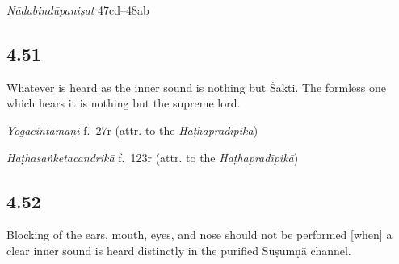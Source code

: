 \begin{ekdosis}
\begin{testimonia}[hp04_050]
\emph{Nādabindūpaniṣat} 47cd–48ab
\begin{versinnote}
\end{versinnote}
\end{testimonia}

\subsection*{4.51}
\begin{translation}[hp04_051]
Whatever is heard as the inner sound is nothing but Śakti. The formless one which hears it is nothing but the supreme lord.
\end{translation}



\begin{testimonia}[hp04_051]
\emph{Yogacintāmaṇi} f.~27r (attr. to the \emph{Haṭhapradīpikā})
\begin{versinnote}
\end{versinnote}

\emph{Haṭhasaṅketacandrikā} f.~123r (attr. to the \emph{Haṭhapradīpikā})
\begin{versinnote}
\end{versinnote}
\end{testimonia}


\subsection*{4.52}
\begin{translation}[hp04_052]
Blocking of the ears, mouth, eyes, and nose should not be performed [when] a clear inner sound is heard distinctly in the purified Suṣumṇā channel.
\end{translation}


\end{ekdosis}
